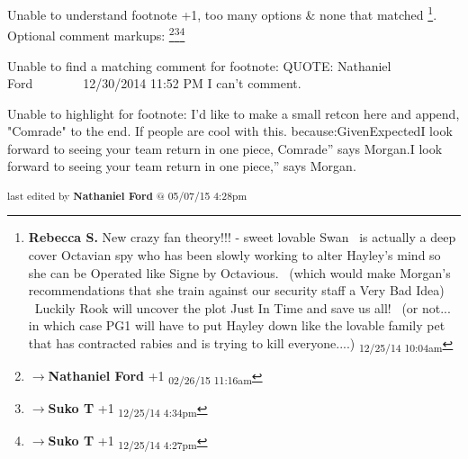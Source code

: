 	Unable to understand footnote +1, too many options & none that matched \footnote{\textbf{Rebecca S. }New crazy fan theory!!! - sweet lovable Swan  is actually a deep cover Octavian spy who has been slowly working to alter Hayley's mind so she can be Operated like Signe by Octavious.  (which would make Morgan's recommendations that she train against our security staff a Very Bad Idea)  Luckily Rook will uncover the plot Just In Time and save us all!  (or not... in which case PG1 will have to put Hayley down like the lovable family pet that has contracted rabies and is trying to kill everyone....) \textsubscript{12/25/14 10:04am}}. Optional comment markups: \footnote{$\rightarrow$\textbf{Nathaniel Ford }+1 \textsubscript{02/26/15 11:16am}}\footnote{$\rightarrow$\textbf{Suko T }+1 \textsubscript{12/25/14 4:34pm}}\footnote{$\rightarrow$\textbf{Suko T }+1 \textsubscript{12/25/14 4:27pm}} 

	Unable to find a matching comment for footnote: QUOTE: Nathaniel Ford        12/30/2014 11:52 PM
I can't comment.

	Unable to highlight for footnote: I'd like to make a small retcon here and append, "Comrade" to the end. If people are cool with this. because:GivenExpectedI look forward to seeing your team return in one piece, Comrade” says Morgan.I look forward to seeing your team return in one piece,” says Morgan.


\fi

\vspace{\fill}

\begin{flushright}
\textsubscript{last edited by \textbf{Nathaniel Ford} @ 05/07/15 4:28pm}
\end{flushright}

